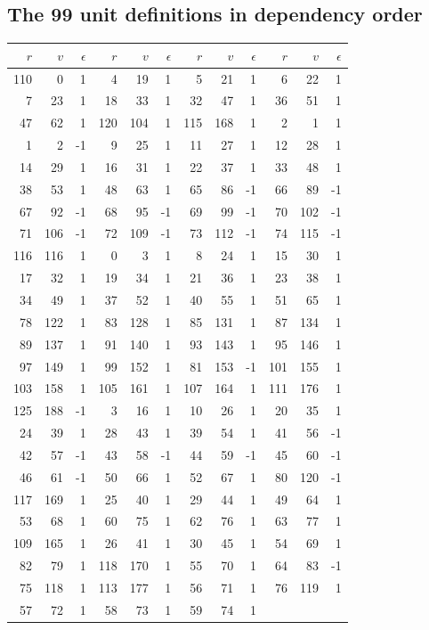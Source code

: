 \subsection*{The 99 unit definitions in dependency order}
\begin{longtable}{rrr@{\qquad}rrr@{\qquad}rrr@{\qquad}rrr}
\toprule
$r$&$v$&$\epsilon$&$r$&$v$&$\epsilon$&$r$&$v$&$\epsilon$&$r$&$v$&$\epsilon$\\\midrule\endhead
110&0&1&4&19&1&5&21&1&6&22&1\\
7&23&1&18&33&1&32&47&1&36&51&1\\
47&62&1&120&104&1&115&168&1&2&1&1\\
1&2&-1&9&25&1&11&27&1&12&28&1\\
14&29&1&16&31&1&22&37&1&33&48&1\\
38&53&1&48&63&1&65&86&-1&66&89&-1\\
67&92&-1&68&95&-1&69&99&-1&70&102&-1\\
71&106&-1&72&109&-1&73&112&-1&74&115&-1\\
116&116&1&0&3&1&8&24&1&15&30&1\\
17&32&1&19&34&1&21&36&1&23&38&1\\
34&49&1&37&52&1&40&55&1&51&65&1\\
78&122&1&83&128&1&85&131&1&87&134&1\\
89&137&1&91&140&1&93&143&1&95&146&1\\
97&149&1&99&152&1&81&153&-1&101&155&1\\
103&158&1&105&161&1&107&164&1&111&176&1\\
125&188&-1&3&16&1&10&26&1&20&35&1\\
24&39&1&28&43&1&39&54&1&41&56&-1\\
42&57&-1&43&58&-1&44&59&-1&45&60&-1\\
46&61&-1&50&66&1&52&67&1&80&120&-1\\
117&169&1&25&40&1&29&44&1&49&64&1\\
53&68&1&60&75&1&62&76&1&63&77&1\\
109&165&1&26&41&1&30&45&1&54&69&1\\
82&79&1&118&170&1&55&70&1&64&83&-1\\
75&118&1&113&177&1&56&71&1&76&119&1\\
57&72&1&58&73&1&59&74&1&&&\\
\bottomrule\end{longtable}
